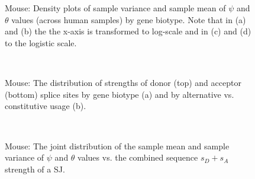\documentclass{article}
\begin{document}
\begin{figure}
\begin{center}
%
\\
%
\\
\caption{Mouse: Density plots of sample variance and sample mean of $\psi$ and $\theta$ values (across human samples) by gene biotype.
Note that in (a) and (b) the the x-axis is transformed to log-scale and in (c) and (d) to the logistic scale.}
\end{center}
\end{figure}

\begin{figure}
\begin{center}
%
\\
\caption{Mouse: The distribution of strengths of donor (top) and acceptor (bottom) splice sites by gene biotype (a) and by alternative vs. constitutive usage (b).}
\end{center}
\end{figure}

\begin{figure}
\begin{center}
%
\\
%
\caption{Mouse: The joint distribution of the sample mean and sample variance of $\psi$ and $\theta$ values vs. the combined sequence $s_D+s_A$ strength of a SJ.}
\end{center}
\end{figure}
\end{document}
